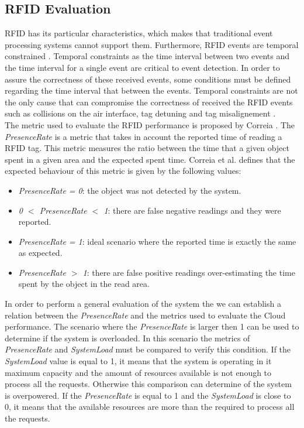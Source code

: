 \subsection{RFID Evaluation}
\label{sub:rfid_evaluation}
RFID has its particular characteristics, which makes that traditional event processing systems cannot support them. Furthermore, RFID
events are temporal constrained \cite{wang2006bridging}. Temporal constraints as the time interval between two events and the time interval
for a single event are critical to event detection. In order to assure the correctness of these received events, some conditions must be defined
regarding the time interval that between the events. Temporal constraints are not the only cause that can compromise the correctness of received
the RFID events such as collisions on the air interface, tag detuning and tag misalignement \cite{floerkemeier2004issues}.\\

The metric used to evaluate the RFID performance is proposed by Correia \cite{Correia:Thesis:2014}. The \textit{PresenceRate} is a metric that takes in account the reported
time of reading a RFID tag. This metric measures the ratio between the time that a given object spent in a given area and the expected spent time. Correia
et al. \cite{Correia:Thesis:2014} defines that the expected behaviour of this metric is given by the following values:
\begin{itemize}
  \item \textit{PresenceRate = 0}: the object was not detected by the system.
  \item \textit{0 $<$ PresenceRate $<$ 1}: there are false negative readings and they were reported.
  \item \textit{PresenceRate = 1}: ideal scenario where the reported time is exactly the same as expected.
  \item \textit{PresenceRate $>$ 1}: there are false positive readings over-estimating the time spent by the object in the read area.
\end{itemize}

In order to perform a general evaluation of the system the we can establish a relation between the \textit{PresenceRate} and the metrics used to evaluate the Cloud
performance. The scenario where the \textit{PresenceRate} is larger then 1 can be used to determine if the system is overloaded. In this scenario the metrics of
\textit{PresenceRate} and \textit{SystemLoad} must be compared to verify this condition. If the \textit{SystemLoad} value is equal to 1, it means that the system is
operating in it maximum capacity and the amount of resources available is not enough to process all the requests. Otherwise this comparison can determine of the system
is overpowered. If the \textit{PresenceRate} is equal to 1 and the \textit{SystemLoad} is close to 0, it means that the available resources are more than the required to
process all the requests.
